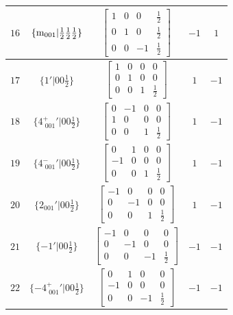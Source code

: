\documentclass[fleqn,8pt]{jsarticle}
\begin{document}
\begin{longtable}{ccccc}
$ 16 $ & $ \{{\rm m}_{001}|\frac{1}{2} \frac{1}{2} \frac{1}{2}\} $ & $ \begin{bmatrix} 1 & 0 & 0 & \frac{1}{2} \\ 0 & 1 & 0 & \frac{1}{2} \\ 0 & 0 & -1 & \frac{1}{2} \end{bmatrix} $ & $ -1 $ & $ 1 $ \\ \hline
$ 17 $ & $ \{1{}'|0 0 \frac{1}{2}\} $ & $ \begin{bmatrix} 1 & 0 & 0 & 0 \\ 0 & 1 & 0 & 0 \\ 0 & 0 & 1 & \frac{1}{2} \end{bmatrix} $ & $ 1 $ & $ -1 $ \\ \hline
$ 18 $ & $ \{4^{+}_{\,\,001}{}'|0 0 \frac{1}{2}\} $ & $ \begin{bmatrix} 0 & -1 & 0 & 0 \\ 1 & 0 & 0 & 0 \\ 0 & 0 & 1 & \frac{1}{2} \end{bmatrix} $ & $ 1 $ & $ -1 $ \\ \hline
$ 19 $ & $ \{4^{-}_{\,\,001}{}'|0 0 \frac{1}{2}\} $ & $ \begin{bmatrix} 0 & 1 & 0 & 0 \\ -1 & 0 & 0 & 0 \\ 0 & 0 & 1 & \frac{1}{2} \end{bmatrix} $ & $ 1 $ & $ -1 $ \\ \hline
$ 20 $ & $ \{2{}_{001}{}'|0 0 \frac{1}{2}\} $ & $ \begin{bmatrix} -1 & 0 & 0 & 0 \\ 0 & -1 & 0 & 0 \\ 0 & 0 & 1 & \frac{1}{2} \end{bmatrix} $ & $ 1 $ & $ -1 $ \\ \hline
$ 21 $ & $ \{-1{}'|0 0 \frac{1}{2}\} $ & $ \begin{bmatrix} -1 & 0 & 0 & 0 \\ 0 & -1 & 0 & 0 \\ 0 & 0 & -1 & \frac{1}{2} \end{bmatrix} $ & $ -1 $ & $ -1 $ \\ \hline
$ 22 $ & $ \{-4^{+}_{\,\,001}{}'|0 0 \frac{1}{2}\} $ & $ \begin{bmatrix} 0 & 1 & 0 & 0 \\ -1 & 0 & 0 & 0 \\ 0 & 0 & -1 & \frac{1}{2} \end{bmatrix} $ & $ -1 $ & $ -1 $ \\ \hline

\end{longtable}
\end{document}
